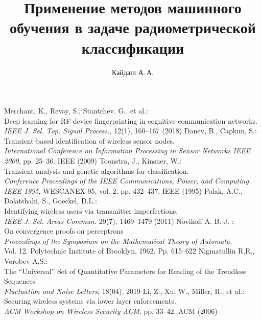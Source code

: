 \documentclass{mipt-thesis-bs}
\title{Применение методов машинного обучения в задаче радиометрической классификации}
\author{Кайдаш А.\,А.}
\begin{document}
\frontmatter
\titlecontents
\mainmatter

%








\backmatter
\begin{thebibliography}{99}
    
        Merchant, K., Revay, S., Stantchev, G., et al.: \\Deep learning for RF device fingerprinting in cognitive communication networks. \\\emph{IEEE J. Sel. Top. Signal Process.}, 12(1), 160–167 (2018)
        Danev, B., Capkun, S.: \\Transient-based identification of wireless sensor nodes. \\\emph{ International Conference on Information Processing in Sensor Networks IEEE 2009}, pp. 25–36. IEEE (2009)
        Toonstra, J., Kinsner, W.: \\Transient analysis and genetic algorithms for classification. \\\emph{ Conference Proceedings of the IEEE Communications, Power, and Computing IEEE 1995}, WESCANEX 95, vol. 2, pp. 432–437. IEEE (1995)
        Polak, A.C., Dolatshahi, S., Goeckel, D.L.: \\Identifying wireless users via transmitter imperfections. \\\emph{IEEE J. Sel. Areas Commun.} 29(7), 1469–1479 (2011)
        Novikoff A. B. J. :\\
        On convergence proofs on perceptrons \\
        \emph{Proceedings of the Symposium on the Mathematical Theory of Automata.} \\
         Vol. 12.  Polytechnic Institute of Brooklyn, 1962.  Pp. 615–622
        Nigmatullin R.R., Vorobev A.S.: \\The “Universal” Set of Quantitative Parameters for Reading of the Trendless Sequences\\  \emph{ Fluctuation and Noise Letters}, 18(04), 2019
        Li, Z., Xu, W., Miller, R., et al.: \\Securing wireless systems via lower layer enforcements. \\\emph{ ACM Workshop on Wireless Security ACM}, pp. 33–42. ACM (2006)

\end{thebibliography}
\end{document}

